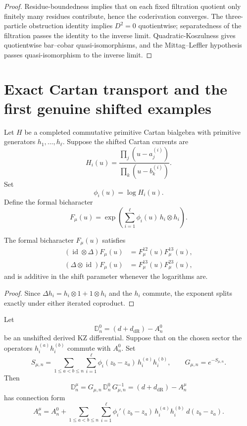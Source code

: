 \begin{proof}
Residue-boundedness implies that on each fixed filtration quotient only
finitely many residues contribute, hence the coderivation converges.
The three-particle obstruction identity implies $D^2=0$ quotientwise;
separatedness of the filtration passes the identity to the inverse
limit. Quadratic-Koszulness gives quotientwise bar--cobar
quasi-isomorphisms, and the Mittag--Leffler hypothesis passes
quasi-isomorphism to the inverse limit.
\end{proof}

\section{Exact Cartan transport and the first genuine shifted examples}

\begin{construction}
Let $H$ be a completed commutative primitive Cartan bialgebra with
primitive generators $h_1,\dots,h_\ell$. Suppose the shifted Cartan
currents are
\[
H_i(u)=
\frac{\prod_j (u-a_j^{(i)})}{\prod_k (u-b_k^{(i)})}.
\]
Set
\[
\phi_i(u)=\log H_i(u).
\]
Define the formal bicharacter
\[
F_\mu(u)=
\exp\!\left(\sum_{i=1}^{\ell} \phi_i(u)\,h_i\otimes h_i\right).
\]
\end{construction}

\begin{proposition}
\ClaimStatusProvedHere
\label{prop:cartan-shift-cocycle}
The formal bicharacter $F_\mu(u)$ satisfies
\begin{align*}
(\operatorname{id}\otimes \Delta)F_\mu(u)
&=F_\mu^{12}(u)F_\mu^{13}(u),\\
(\Delta\otimes \operatorname{id})F_\mu(u)
&=F_\mu^{13}(u)F_\mu^{23}(u),
\end{align*}
and is additive in the shift parameter whenever the logarithms are.
\end{proposition}

\begin{proof}
Since $\Delta h_i=h_i\otimes 1+1\otimes h_i$ and the $h_i$ commute,
the exponent splits exactly under either iterated coproduct.
\end{proof}

\begin{theorem}
\ClaimStatusProvedHere
\label{thm:cartan-gauge-twist}
Let
\[
\mathbb D_n^0=(d+d_{\mathrm{dR}})-A_n^0
\]
be an unshifted derived KZ differential. Suppose that on the chosen
sector the operators $h_i^{(a)}h_i^{(b)}$ commute with $A_n^0$.
Set
\[
S_{\mu,n}=
\sum_{1\le a<b\le n}\sum_{i=1}^{\ell}
\phi_i(z_b-z_a)\,h_i^{(a)}h_i^{(b)},
\qquad
G_{\mu,n}=e^{-S_{\mu,n}}.
\]
Then
\[
\mathbb D_n^\mu=G_{\mu,n}\,\mathbb D_n^0\,G_{\mu,n}^{-1}
=(d+d_{\mathrm{dR}})-A_n^\mu
\]
has connection form
\[
A_n^\mu
=
A_n^0
+
\sum_{1\le a<b\le n}\sum_{i=1}^{\ell}
\phi_i'(z_b-z_a)\,h_i^{(a)}h_i^{(b)}\,d(z_b-z_a).
\]
\end{theorem}

